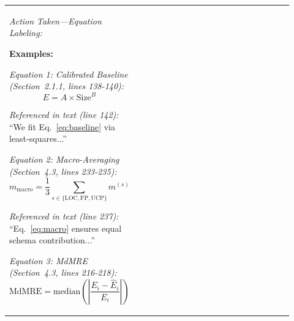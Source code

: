 \documentclass[11pt,a4paper]{article}
\begin{document}
\begin{longtable}{>{\raggedright\arraybackslash}p{0.26\linewidth}|>{\raggedright\arraybackslash}p{0.44\linewidth}|>{\raggedright\arraybackslash}p{0.22\linewidth}}
\textit{Action Taken---Equation Labeling:}

\textbf{Examples:}

\textit{Equation 1: Calibrated Baseline (Section~2.1.1, lines 138-140):}
\begin{equation} \label{eq:baseline}
E = A \times \text{Size}^B
\end{equation}

\textit{Referenced in text (line 142):} ``We fit Eq.~\eqref{eq:baseline} via least-squares...''

\textit{Equation 2: Macro-Averaging (Section~4.3, lines 233-235):}
\begin{equation} \label{eq:macro}
m_{\text{macro}} = \frac{1}{3} \sum_{s \in \{\text{LOC}, \text{FP}, \text{UCP}\}} m^{(s)}
\end{equation}

\textit{Referenced in text (line 237):} ``Eq.~\eqref{eq:macro} ensures equal schema contribution...''

\textit{Equation 3: MdMRE (Section~4.3, lines 216-218):}
\begin{equation} \label{eq:mdmre}
\text{MdMRE} = \text{median}\left(\left|\frac{E_i - \hat{E}_i}{E_i}\right|\right)
\end{equation}


\end{longtable}
\end{document}
